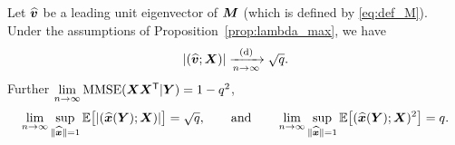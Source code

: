 \documentclass[12pt,nocut]{article}
\begin{document}
\begin{proposition}\label{prop:lim_error_metrics}
	Let $\widehat{{\boldsymbol v}}$ be a leading unit eigenvector of ${\boldsymbol M}$ (which is defined by \eqref{eq:def_M}).
	Under the assumptions of Proposition~\ref{prop:lambda_max}, we have
	\begin{equation}\label{eq:lim_leading}
	| (\widehat{{\boldsymbol v}}; {\boldsymbol X}) | \xrightarrow[n \to \infty]{\rm (d)} \sqrt{q}.
	\end{equation}
Further $\lim\limits_{n \to \infty} {{\rm MMSE}}({\boldsymbol X}{\boldsymbol X}^{{\sf T}}|{\boldsymbol Y}) = 1 - q^2$, 
\begin{equation}\label{eq:lim_correlation_metric}
	\lim_{n \to \infty} \sup_{\|\widehat{{\boldsymbol x}}\| = 1} \mathbb{E}\big[|(\widehat{{\boldsymbol x}}({\boldsymbol Y}); {\boldsymbol X})|\big] = \sqrt{q},
	\qquad \text{and} \qquad
\lim_{n \to \infty} \sup_{\|\widehat{{\boldsymbol x}}\| = 1} \mathbb{E}\big[(\widehat{{\boldsymbol x}}({\boldsymbol Y}); {\boldsymbol X})^2\big] = q.
\end{equation}
\end{proposition}
\end{document}
